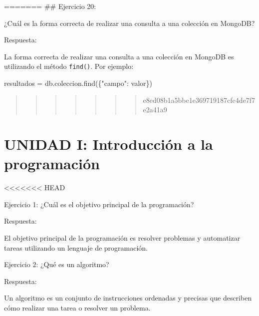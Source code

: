 \documentclass[
  a4paper,
  DIV=11,
  numbers=noendperiod,
  onepage,
  openany]{scrreprt}
\newenvironment{Shaded}{\begin{snugshade}}{\end{snugshade}}
\newcommand{\NormalTok}[1]{\textcolor[rgb]{0.00,0.23,0.31}{#1}}
\newcommand{\OperatorTok}[1]{\textcolor[rgb]{0.37,0.37,0.37}{#1}}
\newcommand{\StringTok}[1]{\textcolor[rgb]{0.13,0.47,0.30}{#1}}
\begin{document}
======= \#\# Ejercicio 20:

¿Cuál es la forma correcta de realizar una consulta a una colección en
MongoDB?

Respuesta:

La forma correcta de realizar una consulta a una colección en MongoDB es
utilizando el método \texttt{find()}. Por ejemplo:

\begin{Shaded}
\begin{Highlighting}[]
\NormalTok{resultados }\OperatorTok{=}\NormalTok{ db.coleccion.find(\{}\StringTok{"campo"}\NormalTok{: valor\})}
\end{Highlighting}
\end{Shaded}

\begin{quote}
\begin{quote}
\begin{quote}
\begin{quote}
\begin{quote}
\begin{quote}
\begin{quote}
e8ed08b1a5bbe1e369719187cfc4de7f7e2a41a9
\end{quote}
\end{quote}
\end{quote}
\end{quote}
\end{quote}
\end{quote}
\end{quote}

\hypertarget{unidad-i-introducciuxf3n-a-la-programaciuxf3n}{%
\chapter{UNIDAD I: Introducción a la
programación}\label{unidad-i-introducciuxf3n-a-la-programaciuxf3n}}

\textless\textless\textless\textless\textless\textless\textless{} HEAD

Ejercicio 1: ¿Cuál es el objetivo principal de la programación?

Respuesta:

El objetivo principal de la programación es resolver problemas y
automatizar tareas utilizando un lenguaje de programación.

Ejercicio 2: ¿Qué es un algoritmo?

Respuesta:

Un algoritmo es un conjunto de instrucciones ordenadas y precisas que
describen cómo realizar una tarea o resolver un problema.
\end{document}
